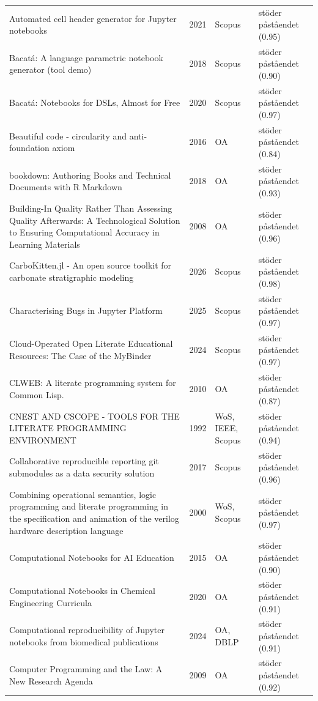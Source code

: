 \begin{longtable}{@{}%
  >{\raggedright\arraybackslash}p{}c%
  >{\raggedright\arraybackslash}p{}%
  >{\raggedright\arraybackslash}p{}@{}}
Automated cell header generator for Jupyter notebooks & 2021 & Scopus & stöder påståendet (0.95) \\
Bacatá: A language parametric notebook generator (tool demo) & 2018 & Scopus & stöder påståendet (0.90) \\
Bacatá: Notebooks for DSLs, Almost for Free & 2020 & Scopus & stöder påståendet (0.97) \\
Beautiful code - circularity and anti-foundation axiom & 2016 & OA & stöder påståendet (0.84) \\
bookdown: Authoring Books and Technical Documents with R Markdown & 2018 & OA & stöder påståendet (0.93) \\
Building-In Quality Rather Than Assessing Quality Afterwards: A Technological Solution to Ensuring Computational Accuracy in Learning Materials & 2008 & OA & stöder påståendet (0.96) \\
CarboKitten.jl - An open source toolkit for carbonate stratigraphic modeling & 2026 & Scopus & stöder påståendet (0.98) \\
Characterising Bugs in Jupyter Platform & 2025 & Scopus & stöder påståendet (0.97) \\
Cloud-Operated Open Literate Educational Resources: The Case of the MyBinder & 2024 & Scopus & stöder påståendet (0.97) \\
CLWEB: A literate programming system for Common Lisp. & 2010 & OA & stöder påståendet (0.87) \\
CNEST AND CSCOPE - TOOLS FOR THE LITERATE PROGRAMMING ENVIRONMENT & 1992 & WoS, IEEE, Scopus & stöder påståendet (0.94) \\
Collaborative reproducible reporting git submodules as a data security solution & 2017 & Scopus & stöder påståendet (0.96) \\
Combining operational semantics, logic programming and literate programming in the specification and animation of the verilog hardware description language & 2000 & WoS, Scopus & stöder påståendet (0.97) \\
Computational Notebooks for AI Education & 2015 & OA & stöder påståendet (0.90) \\
Computational Notebooks in Chemical Engineering Curricula & 2020 & OA & stöder påståendet (0.91) \\
Computational reproducibility of Jupyter notebooks from biomedical publications & 2024 & OA, DBLP & stöder påståendet (0.91) \\
Computer Programming and the Law: A New Research Agenda & 2009 & OA & stöder påståendet (0.92) \\

\end{longtable}
